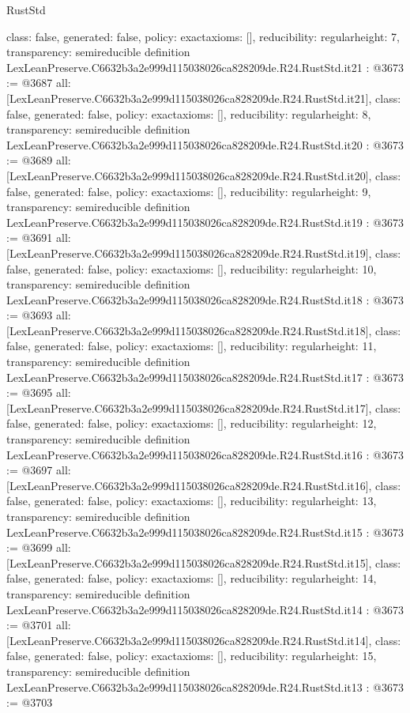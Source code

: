 \begin{lexlean}{RustStd}
\begin{coremodule}
{  class: false,
  generated: false,
  policy: exact{axioms: []},
  reducibility: regular{height: 7},
  transparency: semireducible
}
definition LexLeanPreserve.C6632b3a2e999d115038026ca828209de.R24.RustStd.it21 : @3673 := @3687 {
  all: [LexLeanPreserve.C6632b3a2e999d115038026ca828209de.R24.RustStd.it21],
  class: false,
  generated: false,
  policy: exact{axioms: []},
  reducibility: regular{height: 8},
  transparency: semireducible
}
definition LexLeanPreserve.C6632b3a2e999d115038026ca828209de.R24.RustStd.it20 : @3673 := @3689 {
  all: [LexLeanPreserve.C6632b3a2e999d115038026ca828209de.R24.RustStd.it20],
  class: false,
  generated: false,
  policy: exact{axioms: []},
  reducibility: regular{height: 9},
  transparency: semireducible
}
definition LexLeanPreserve.C6632b3a2e999d115038026ca828209de.R24.RustStd.it19 : @3673 := @3691 {
  all: [LexLeanPreserve.C6632b3a2e999d115038026ca828209de.R24.RustStd.it19],
  class: false,
  generated: false,
  policy: exact{axioms: []},
  reducibility: regular{height: 10},
  transparency: semireducible
}
definition LexLeanPreserve.C6632b3a2e999d115038026ca828209de.R24.RustStd.it18 : @3673 := @3693 {
  all: [LexLeanPreserve.C6632b3a2e999d115038026ca828209de.R24.RustStd.it18],
  class: false,
  generated: false,
  policy: exact{axioms: []},
  reducibility: regular{height: 11},
  transparency: semireducible
}
definition LexLeanPreserve.C6632b3a2e999d115038026ca828209de.R24.RustStd.it17 : @3673 := @3695 {
  all: [LexLeanPreserve.C6632b3a2e999d115038026ca828209de.R24.RustStd.it17],
  class: false,
  generated: false,
  policy: exact{axioms: []},
  reducibility: regular{height: 12},
  transparency: semireducible
}
definition LexLeanPreserve.C6632b3a2e999d115038026ca828209de.R24.RustStd.it16 : @3673 := @3697 {
  all: [LexLeanPreserve.C6632b3a2e999d115038026ca828209de.R24.RustStd.it16],
  class: false,
  generated: false,
  policy: exact{axioms: []},
  reducibility: regular{height: 13},
  transparency: semireducible
}
definition LexLeanPreserve.C6632b3a2e999d115038026ca828209de.R24.RustStd.it15 : @3673 := @3699 {
  all: [LexLeanPreserve.C6632b3a2e999d115038026ca828209de.R24.RustStd.it15],
  class: false,
  generated: false,
  policy: exact{axioms: []},
  reducibility: regular{height: 14},
  transparency: semireducible
}
definition LexLeanPreserve.C6632b3a2e999d115038026ca828209de.R24.RustStd.it14 : @3673 := @3701 {
  all: [LexLeanPreserve.C6632b3a2e999d115038026ca828209de.R24.RustStd.it14],
  class: false,
  generated: false,
  policy: exact{axioms: []},
  reducibility: regular{height: 15},
  transparency: semireducible
}
definition LexLeanPreserve.C6632b3a2e999d115038026ca828209de.R24.RustStd.it13 : @3673 := @3703 {
}
\end{coremodule}
\end{lexlean}
